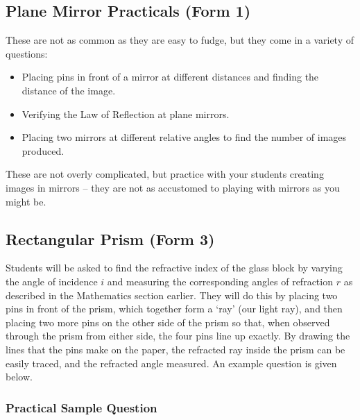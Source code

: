 \subsection{Plane Mirror Practicals (Form 1)}

These are not as common as they are easy to fudge, but they come in a variety of
questions:
\begin{itemize}
\item{Placing pins in front of a mirror at different distances and finding the distance of
the image.}
\item{Verifying the Law of Reflection at plane mirrors.}
\item{Placing two mirrors at different relative angles to find the number of images
produced.}
\end{itemize}
These are not overly complicated, but practice with your students creating images in
mirrors -- they are not as accustomed to playing with mirrors as you might be.

\subsection{Rectangular Prism (Form 3)}

Students will be asked to find the refractive index of the glass block by varying
the angle of incidence $i$ and measuring the corresponding angles of refraction $r$ as
described in the Mathematics section earlier. They will do this by placing two pins in
front of the prism, which together form a `ray' (our light ray), and then placing two more
pins on the other side of the prism so that, when observed through the prism from either
side, the four pins line up exactly. By drawing the lines that the pins make on the paper,
the refracted ray inside the prism can be easily traced, and the refracted angle measured.
An example question is given below.

\subsubsection{Practical Sample Question}

